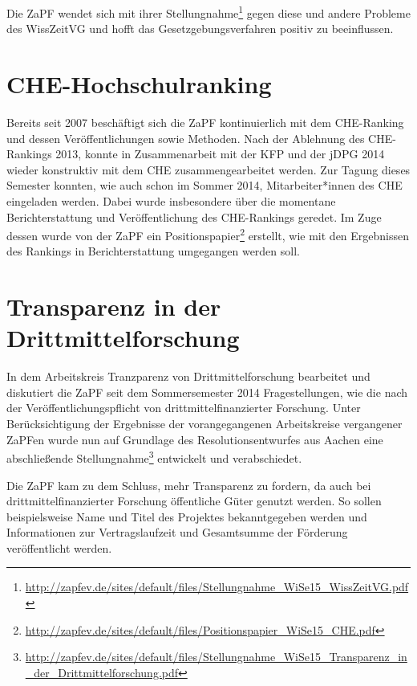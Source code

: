 Die ZaPF wendet sich mit ihrer
Stellungnahme\footnote{\href{http://zapfev.de/sites/default/files/Stellungnahme\_WiSe15\_WissZeitVG.pdf}{\url{http://zapfev.de/sites/default/files/Stellungnahme\_WiSe15\_WissZeitVG.pdf}}}
gegen diese und andere Probleme des WissZeitVG und hofft das
Gesetzgebungsverfahren positiv zu beeinflussen.

\section*{CHE-Hochschulranking}
Bereits seit 2007 beschäftigt sich die ZaPF kontinuierlich mit dem CHE-Ranking
und dessen Veröffentlichungen sowie Methoden. Nach der Ablehnung des CHE-Rankings
2013, konnte in Zusammenarbeit mit der KFP und der jDPG 2014 wieder konstruktiv
mit dem CHE zusammengearbeitet werden. Zur Tagung dieses Semester konnten, wie auch schon im Sommer 2014,
Mitarbeiter*innen des CHE eingeladen werden. Dabei wurde insbesondere über die
momentane Berichterstattung und Veröffentlichung des CHE-Rankings geredet. Im
Zuge dessen wurde von der ZaPF ein
Positionspapier\footnote{\href{http://zapfev.de/sites/default/files/Positionspapier\_WiSe15\_CHE.pdf}{\url{http://zapfev.de/sites/default/files/Positionspapier\_WiSe15\_CHE.pdf}}}
erstellt, wie mit den Ergebnissen des Rankings in Berichterstattung umgegangen
werden soll.

\section*{Transparenz in der Drittmittelforschung}
In dem Arbeitskreis \glqq{}Tranzparenz von Drittmittelforschung\grqq{}
bearbeitet und diskutiert die ZaPF seit dem Sommersemester 2014 Fragestellungen,
wie die nach der Veröffentlichungspflicht von drittmittelfinanzierter Forschung.
Unter Berücksichtigung der Ergebnisse der vorangegangenen Arbeitskreise
vergangener ZaPFen wurde nun auf Grundlage des Resolutionsentwurfes aus Aachen
eine abschließende
Stellungnahme\footnote{\href{http://zapfev.de/sites/default/files/Stellungnahme\_WiSe15\_Transparenz\_in\_der\_Drittmittelforschung.pdf}{\url{http://zapfev.de/sites/default/files/Stellungnahme\_WiSe15\_Transparenz\_in\_der\_Drittmittelforschung.pdf}}}
entwickelt und verabschiedet.

Die ZaPF kam zu dem Schluss, mehr Transparenz zu fordern, da auch bei
drittmittelfinanzierter Forschung öffentliche Güter genutzt werden. So sollen
beispielsweise Name und Titel des Projektes bekanntgegeben werden und
Informationen zur Vertragslaufzeit und Gesamtsumme der Förderung veröffentlicht
werden.


